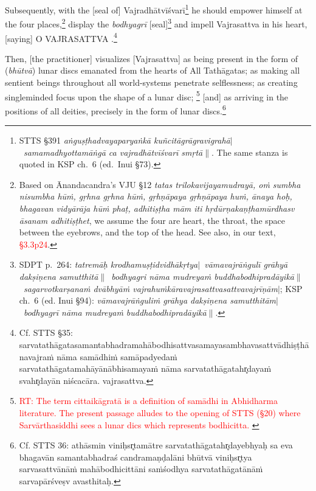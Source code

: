 \documentclass[11pt]{book}
\makeatletter
\def\fakesc#1{%
  \begingroup%
  \xdef\fake@name{\csname\curr@fontshape/\f@size\endcsname}%
  \fontsize{1.3\fontdimen8\fake@name}{\baselineskip}\selectfont%
  \uppercase{#1}%
  \endgroup%
}
\newcommand{\mantra}[1]{\fakesc{#1}}
\newcommand{\danda}{\thinspace$\mid$}
\newcommand{\ddanda}{\thinspace$\parallel$}
\newcommand{\red}[1]{\textcolor{red}{#1}}
\newcommand{\skt}[1]{\emph{#1}}
\makeatother
\begin{document}
Subsequently, with the [seal of] Vajradhātvīśvarī\footnote{STTS §391 \skt{aṅguṣṭhadvayaparyaṅkā kuñcitāgrāgravigrahā\danda\ 
samamadhyottamāṅgā ca vajradhātvīśvarī smṛtā\ddanda}. The same stanza is quoted in KSP ch.~6 (ed.\ Inui §73).} he should empower himself at the four places,\footnote{Based on Ānandacandra's VJU §12 \skt{tatas trilokavijayamudrayā, oṁ sumbha nisumbha hūṁ, gṛhna gṛhna hūṁ, gṛhṇāpaya gṛhṇāpaya huṁ, ānaya hoḥ, bhagavan vidyārāja hūṁ phaṭ, adhitiṣṭha mām iti hṛdūrṇakaṇṭhamūrdhasv āsanam adhitiṣṭhet}, we assume the four are heart, the throat, the space between the eyebrows, and the top of the head. See also, in our text, \red{§3.3p24}.
} display the \skt{bodhyagrī} [seal]\footnote{SDPT p.~264: \skt{tatremāḥ krodhamuṣṭidvidhākṛtya\danda\ vāmavajrāṅgulī grāhyā dakṣiṇena samutthitā\ddanda\ bodhyagri nāma mudreyaṁ buddhabodhipradāyikā\ddanda\ sagarvotkarṣanaṁ dvābhyāṁ vajrahuṁkāravajrasattvasattvavajrīṇām\danda}; KSP ch.~6 (ed. Inui §94):
\skt{vāmavajrāṅguliṁ grāhya dakṣiṇena samutthitām\danda\ bodhyagrī nāma mudreyaṁ buddhabodhipradāyikā\ddanda}.} and impell Vajrasattva in his heart, [saying] \mantra{o Vajrasattva}.\footnote{Cf. STTS §35: sarvatathāgatasamantabhadramahābodhisattvasamayasambhavasattvādhiṣṭhānavajraṁ nāma samādhiṁ samāpadyedaṁ sarvatathāgatamahāyānābhisamayaṁ nāma sarvatathāgatahr̥dayaṁ svahr̥dayān niścacāra. vajrasattva.}

Then, [the practitioner] visualizes [Vajrasattva] as being present in the form of (\skt{bhūtvā}) lunar discs emanated from the hearts of All Tathāgatas; as making all sentient beings throughout all world-systems penetrate selflessness; as creating singleminded focus upon the shape of a lunar disc; \footnote{\red{RT: The term cittaikāgratā is a definition of samādhi in Abhidharma literature. The present passage alludes to the opening of STTS (§20) where Sarvārthasiddhi sees a lunar dics which represents bodhicitta. }} [and] as arriving in the positions of all deities, precisely in the form of lunar discs.\footnote{Cf. STTS 36: 
athāsmin viniḥsr̥tamātre sarvatathāgatahr̥dayebhyaḥ sa eva bhagavān samantabhadraś candramaṇḍalāni bhūtvā viniḥsr̥tya sarvasattvānāṁ mahābodhicittāni saṁśodhya sarvatathāgatānāṁ sarvapārśveṣv avasthitaḥ.}
\end{document}
